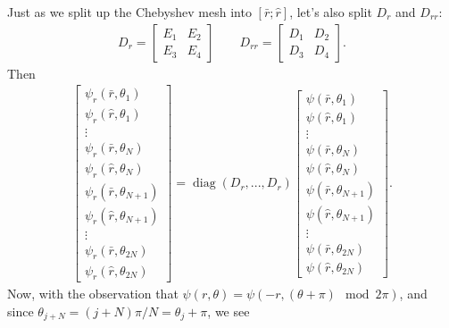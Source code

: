 Just as we split up the Chebyshev mesh into $[\bar{r}; \hat{r}]$,
let's also split $D_r$ and $D_{rr}$:
\begin{align*}
 D_r = \left[
       \begin{array}{c|c} E_1 & E_2 \\ \hline
                          E_3 & E_4
       \end{array}\right]
 \qquad
 D_{rr} = \left[
       \begin{array}{c|c} D_1 & D_2 \\ \hline
                          D_3 & D_4
       \end{array}\right].
\end{align*}
Then
\begin{align*}
 \begin{bmatrix}
  \psi_r(\bar{r},\theta_1) \\
  \psi_r(\hat{r},\theta_1) \\
    \vdots                 \\
  \psi_r(\bar{r},\theta_N) \\
  \psi_r(\hat{r},\theta_N) \\
  \psi_r(\bar{r},\theta_{N+1}) \\
  \psi_r(\hat{r},\theta_{N+1}) \\
    \vdots                 \\
  \psi_r(\bar{r},\theta_{2N}) \\
  \psi_r(\hat{r},\theta_{2N})
 \end{bmatrix}
 =
 \operatorname{diag}(D_r, ... , D_r)
 \begin{bmatrix}
  \psi(\bar{r},\theta_1) \\
  \psi(\hat{r},\theta_1) \\
    \vdots                 \\
  \psi(\bar{r},\theta_N) \\
  \psi(\hat{r},\theta_N) \\
  \psi(\bar{r},\theta_{N+1}) \\
  \psi(\hat{r},\theta_{N+1}) \\
    \vdots                 \\
  \psi(\bar{r},\theta_{2N}) \\
  \psi(\hat{r},\theta_{2N})
 \end{bmatrix}.
\end{align*}
Now, with the observation that $\psi(r,\theta) =                                                
\psi(-r,(\theta + \pi)\mod 2\pi)$, and since
$\theta_{j+N} = (j+N)\pi/N = \theta_j + \pi$,
we see

